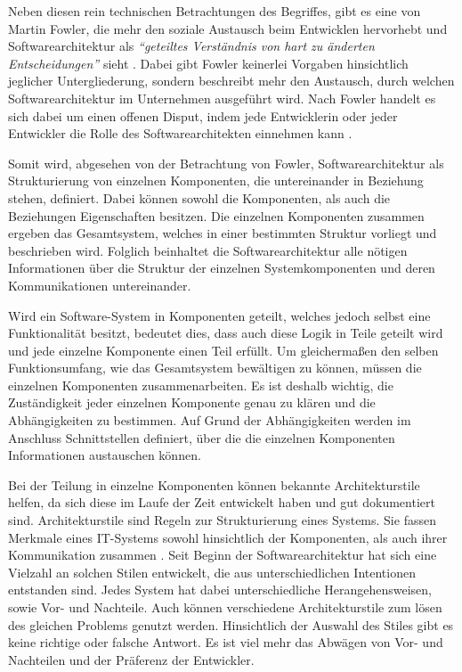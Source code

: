 Neben diesen rein technischen Betrachtungen des Begriffes, gibt es eine von Martin Fowler, die mehr den soziale Austausch beim Entwicklen hervorhebt und Softwarearchitektur als  \textit{\enquote{geteiltes Verständnis von hart zu änderten Entscheidungen}} sieht \parencite[][S. 3]{fowler_who_2003}. Dabei gibt Fowler keinerlei Vorgaben hinsichtlich jeglicher Untergliederung, sondern beschreibt mehr den Austausch, durch welchen Softwarearchitektur im Unternehmen ausgeführt wird. Nach Fowler handelt es sich dabei um einen offenen Disput, indem jede Entwicklerin oder jeder Entwickler die Rolle des Softwarearchitekten einnehmen kann \parencite[][S. 3 f.]{fowler_who_2003}.

Somit wird, abgesehen von der Betrachtung von Fowler, Softwarearchitektur als Strukturierung von einzelnen Komponenten, die untereinander in Beziehung stehen, definiert. Dabei können sowohl die Komponenten, als auch die Beziehungen Eigenschaften besitzen. Die einzelnen Komponenten zusammen ergeben das Gesamtsystem, welches in einer bestimmten Struktur vorliegt und beschrieben wird. Folglich beinhaltet die Softwarearchitektur alle nötigen Informationen über die Struktur der einzelnen Systemkomponenten und deren Kommunikationen untereinander.

Wird ein Software-System in Komponenten geteilt, welches jedoch selbst eine Funktionalität besitzt, bedeutet dies, dass auch diese Logik in Teile geteilt wird und jede einzelne Komponente einen Teil erfüllt. Um gleichermaßen den selben Funktionsumfang, wie das Gesamtsystem bewältigen zu können, müssen die einzelnen Komponenten zusammenarbeiten. Es ist deshalb wichtig, die Zuständigkeit jeder einzelnen Komponente genau zu klären und die Abhängigkeiten zu bestimmen. Auf Grund der Abhängigkeiten werden im Anschluss Schnittstellen definiert, über die die einzelnen Komponenten Informationen austauschen können.

Bei der Teilung in einzelne Komponenten können bekannte Architekturstile helfen, da sich diese im Laufe der Zeit entwickelt haben und gut dokumentiert sind. Architekturstile sind Regeln zur Strukturierung eines Systems. Sie fassen Merkmale eines IT-Systems sowohl hinsichtlich der Komponenten, als auch ihrer Kommunikation zusammen \parencite[vgl.][S. 102]{starke_effektive_2015}. Seit Beginn der Softwarearchitektur hat sich eine Vielzahl an solchen Stilen entwickelt, die aus unterschiedlichen Intentionen entstanden sind. Jedes System hat dabei unterschiedliche Herangehensweisen, sowie Vor- und Nachteile. 
Auch können verschiedene Architekturstile zum lösen des gleichen Problems genutzt werden. Hinsichtlich der Auswahl des Stiles gibt es keine richtige oder falsche Antwort. Es ist viel mehr das Abwägen von Vor- und Nachteilen und der Präferenz der Entwickler.

